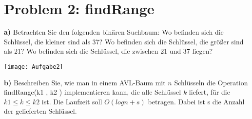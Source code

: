 \section*{Problem 2: findRange} 


\textbf{a)} Betrachten Sie den folgenden binären Suchbaum:
\noindent
Wo befinden sich die Schlüssel, die kleiner sind als 37? Wo befinden sich die
Schlüssel, die größer sind als 21? Wo befinden sich die Schlüssel, die zwischen
21 und 37 liegen?

\begin{center}
\texttt{[image: Aufgabe2]}
\end{center}

\noindent
\textbf{b)} Beschreiben Sie, wie man in einem AVL-Baum mit $n$ Schlüsseln die Operation
findRange(k1 , k2 ) implementieren kann, die alle Schlüssel $k$ liefert, für die
$k1 \leq k \leq k2$ ist. Die Laufzeit soll $O(log n + s)$ betragen. Dabei ist s die Anzahl
der gelieferten Schlüssel.




 







